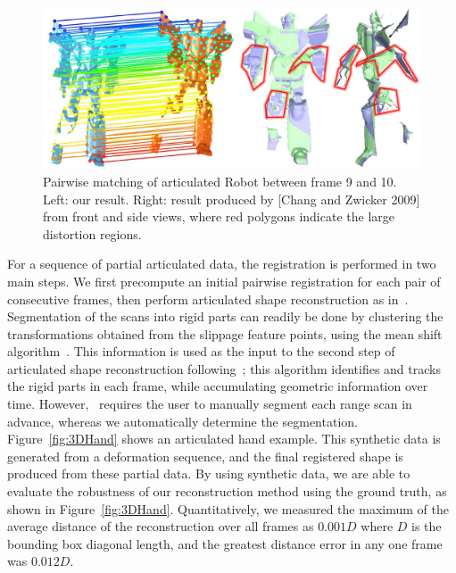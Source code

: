 \begin{figure}[h]
\centering
  \includegraphics[width=0.95\linewidth]{figures/Robot.pdf}
  \caption{Pairwise matching of articulated Robot between frame 9 and 10. 
           Left: our result. Right: result produced by [Chang and Zwicker 2009] from front and side views, where red polygons indicate the large distortion regions.}
\label{fig:3DRobot}
\end{figure}

For a sequence of partial articulated data, the registration is performed in two main steps.
We first precompute an initial pairwise registration for each pair of consecutive frames, then perform articulated shape reconstruction as in~\cite{Pekelny08}.
Segmentation of the scans into rigid parts can readily be done by clustering the transformations obtained from the slippage feature points,
using the mean shift algorithm~\cite{Comaniciu02}.
This information is used as the input to the second step of articulated shape reconstruction following~\cite{Pekelny08};
this algorithm identifies and tracks the rigid parts in each frame, while accumulating  geometric information over time.
However,~\cite{Pekelny08} requires the user to manually segment each range scan in advance,  whereas we automatically determine  the segmentation.
Figure~\ref{fig:3DHand} shows an articulated hand example.
This synthetic data is generated from a deformation sequence, and the final registered shape is produced from these partial data.
By using synthetic data, we are able to evaluate the robustness of our reconstruction method using the ground truth, as shown in Figure~\ref{fig:3DHand}.
Quantitatively, we measured the maximum of the average distance of the reconstruction over all frames as $0.001 D$ where $D$ is the bounding box diagonal length, and
the greatest distance error in any one frame was $0.012 D$.

